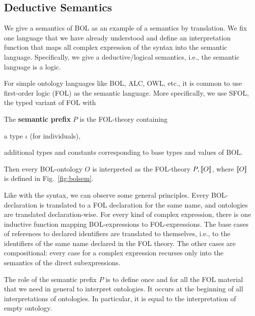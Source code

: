 \subsection{Deductive Semantics}

We give a semantics of BOL as an example of a semantics by translation.
We fix one language that we have already understood and define an interpretation function that maps all complex expression of the syntax into the semantic language.
Specifically, we give a deductive/logical semantics, i.e., the semantic language is a logic.

For simple ontology languages like BOL, ALC, OWL, etc., it is common to use first-order logic (FOL) as the semantic language.
More specifically, we use SFOL, the typed variant of FOL with
\begin{definition}
The \textbf{semantic prefix} $P$ is the FOL-theory containing
\begin{compactitem}
 \item a type $\iota$ (for individuals),
 \item additional types and constants corresponding to base types and values of BOL.
\end{compactitem}

Then every BOL-ontology $O$ is interpreted as the FOL-theory $P,\llbracket O\rrbracket$, where $\llbracket O\rrbracket$ is defined in Fig.~\ref{fig:bolsem}.
\end{definition}

Like with the syntax, we can observe some general principles.
Every BOL-declaration is translated to a FOL declaration for the same name, and ontologies are translated declaration-wise.
For every kind of complex expression, there is one inductive function mapping BOL-expressions to FOL-expressions.
The base cases of references to declared identifiers are translated to themselves, i.e., to the identifiers of the same name declared in the FOL theory.
The other cases are compositional: every case for a complex expression recurses only into the semantics of the direct subexpressions.

The role of the semantic prefix $P$ is to define once and for all the FOL material that we need in general to interpret ontologies.
It occurs at the beginning of all interpretations of ontologies.
In particular, it is equal to the interpretation of empty ontology.

